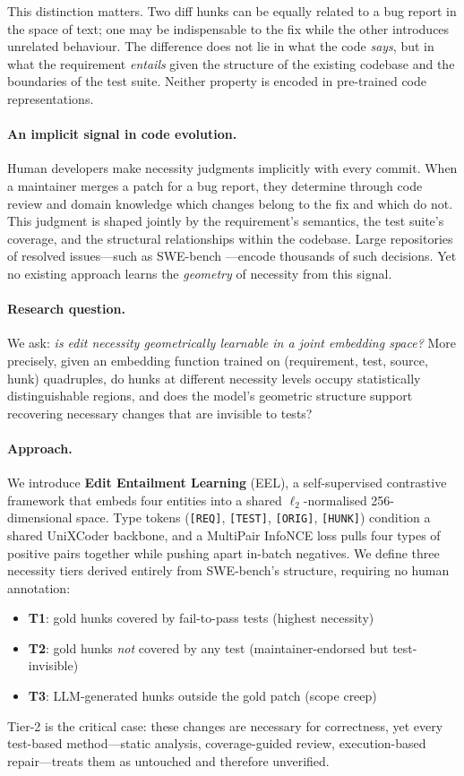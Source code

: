 \documentclass{article}
\newcommand{\REQ}{\texttt{[REQ]}}
\newcommand{\TEST}{\texttt{[TEST]}}
\newcommand{\ORIG}{\texttt{[ORIG]}}
\newcommand{\HUNK}{\texttt{[HUNK]}}
\newcommand{\tier}[1]{\textbf{T#1}}
\begin{document}
This distinction matters.
Two diff hunks can be equally related to a bug report in the space of text;
one may be indispensable to the fix while the other introduces unrelated
behaviour.
The difference does not lie in what the code \emph{says}, but in what the
requirement \emph{entails} given the structure of the existing codebase and
the boundaries of the test suite.
Neither property is encoded in pre-trained code representations.

\paragraph{An implicit signal in code evolution.}
Human developers make necessity judgments implicitly with every commit.
When a maintainer merges a patch for a bug report, they determine through code
review and domain knowledge which changes belong to the fix and which do not.
This judgment is shaped jointly by the requirement's semantics, the test
suite's coverage, and the structural relationships within the codebase.
Large repositories of resolved issues---such as SWE-bench
\citep{jimenez2024swebench}---encode thousands of such decisions.
Yet no existing approach learns the \emph{geometry} of necessity from this
signal.

\paragraph{Research question.}
We ask: \emph{is edit necessity geometrically learnable in a joint embedding
space?}
More precisely, given an embedding function trained on (requirement, test,
source, hunk) quadruples, do hunks at different necessity levels occupy
statistically distinguishable regions, and does the model's geometric
structure support recovering necessary changes that are invisible to tests?

\paragraph{Approach.}
We introduce \textbf{Edit Entailment Learning} (EEL), a self-supervised
contrastive framework that embeds four entities into a shared $\ell_2$-normalised
256-dimensional space.
Type tokens (\REQ, \TEST, \ORIG, \HUNK) condition a shared UniXCoder
\citep{guo2022unixcoder} backbone, and a MultiPair InfoNCE loss pulls four
types of positive pairs together while pushing apart in-batch negatives.
We define three necessity tiers derived entirely from SWE-bench's structure,
requiring no human annotation:
\begin{itemize}[itemsep=2pt,topsep=2pt]
  \item \tier{1}: gold hunks covered by fail-to-pass tests (highest necessity)
  \item \tier{2}: gold hunks \emph{not} covered by any test (maintainer-endorsed
    but test-invisible)
  \item \tier{3}: LLM-generated hunks outside the gold patch (scope creep)
\end{itemize}
Tier-2 is the critical case: these changes are necessary for correctness, yet
every test-based method---static analysis, coverage-guided review,
execution-based repair---treats them as untouched and therefore unverified.
\end{document}
